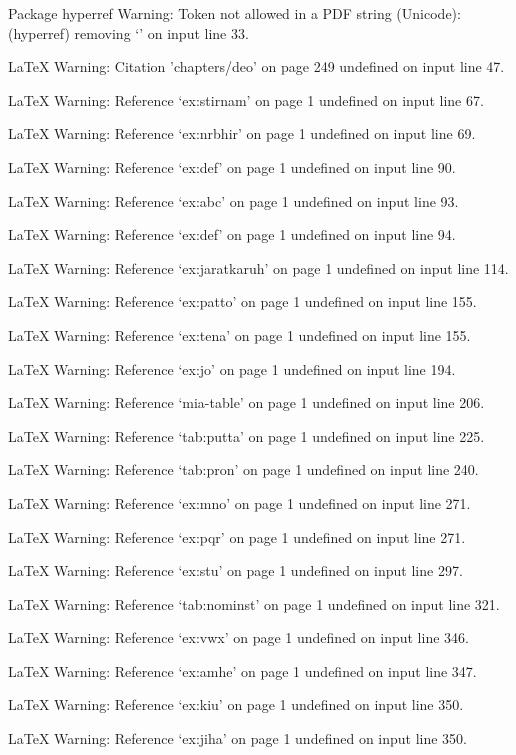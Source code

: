 Package hyperref Warning: Token not allowed in a PDF string (Unicode):
(hyperref)                removing `\newline' on input line 33.


LaTeX Warning: Citation 'chapters/deo' on page 249 undefined on input line 47.


LaTeX Warning: Reference `ex:stirnam' on page 1 undefined on input line 67.


LaTeX Warning: Reference `ex:nrbhir' on page 1 undefined on input line 69.


LaTeX Warning: Reference `ex:def' on page 1 undefined on input line 90.


LaTeX Warning: Reference `ex:abc' on page 1 undefined on input line 93.


LaTeX Warning: Reference `ex:def' on page 1 undefined on input line 94.


LaTeX Warning: Reference `ex:jaratkaruh' on page 1 undefined on input line 114.


LaTeX Warning: Reference `ex:patto' on page 1 undefined on input line 155.


LaTeX Warning: Reference `ex:tena' on page 1 undefined on input line 155.


LaTeX Warning: Reference `ex:jo' on page 1 undefined on input line 194.


LaTeX Warning: Reference `mia-table' on page 1 undefined on input line 206.


LaTeX Warning: Reference `tab:putta' on page 1 undefined on input line 225.


LaTeX Warning: Reference `tab:pron' on page 1 undefined on input line 240.


LaTeX Warning: Reference `ex:mno' on page 1 undefined on input line 271.


LaTeX Warning: Reference `ex:pqr' on page 1 undefined on input line 271.


LaTeX Warning: Reference `ex:stu' on page 1 undefined on input line 297.


LaTeX Warning: Reference `tab:nominst' on page 1 undefined on input line 321.


LaTeX Warning: Reference `ex:vwx' on page 1 undefined on input line 346.


LaTeX Warning: Reference `ex:amhe' on page 1 undefined on input line 347.


LaTeX Warning: Reference `ex:kiu' on page 1 undefined on input line 350.


LaTeX Warning: Reference `ex:jiha' on page 1 undefined on input line 350.


